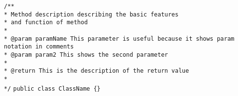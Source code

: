 \documentclass{scrreprt}
\begin{document}
\texttt{/** \\}
\texttt{* Method description describing the basic features \\}
\texttt{* and function of method\\}
\texttt{* \\}
\texttt{* @param paramName This parameter is useful because it shows param notation in comments \\}
\texttt{* @param param2 This shows the second parameter \\}
\texttt{* \\}
\texttt{* @return This is the description of the return value\\}
\texttt{* \\}
\texttt{*/}
\texttt{public class ClassName \{\}}
\end{document}
